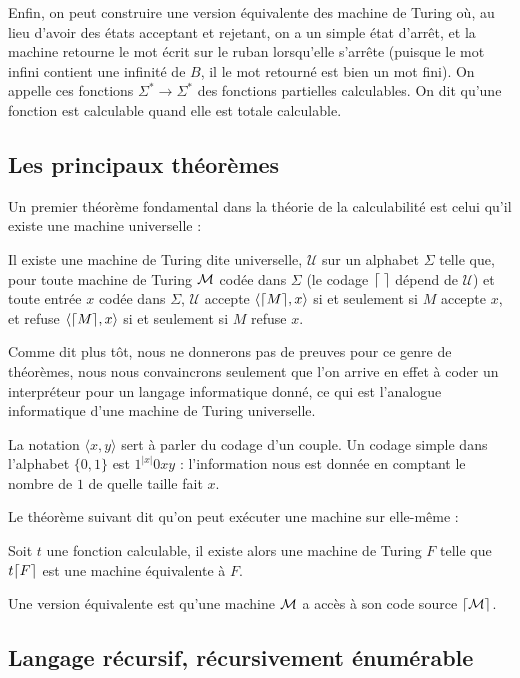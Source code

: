 Enfin, on peut construire une version équivalente des machine de Turing où, au lieu d'avoir des états acceptant et rejetant, on a un simple état d'arrêt, et la machine retourne le mot écrit sur le ruban lorsqu'elle s'arrête (puisque le mot infini contient une infinité de $B$, il le mot retourné est bien un mot fini). On appelle ces fonctions $\Sigma^*\to \Sigma^*$ des fonctions partielles calculables. On dit qu'une fonction est calculable quand elle est totale calculable.

\subsection{Les principaux théorèmes}

Un premier théorème fondamental dans la théorie de la calculabilité est celui qu'il existe une machine universelle :

\begin{them}
    Il existe une machine de Turing dite universelle, $\mathcal U$ sur un alphabet $\Sigma$ telle que, pour toute machine de Turing $\mathcal M$ codée dans $\Sigma$ (le codage $\lceil \; \rceil$ dépend de $\mathcal U$) et toute entrée $x$ codée dans $\Sigma$, $\mathcal U$ accepte $\langle \lceil M \rceil,x\rangle$ si et seulement si $M$ accepte $x$, et refuse $\langle \lceil M \rceil,x\rangle$ si et seulement si $M$ refuse $x$.
\end{them}

Comme dit plus tôt, nous ne donnerons pas de preuves pour ce genre de théorèmes, nous nous convaincrons seulement que l'on arrive en effet à coder un interpréteur pour un langage informatique donné, ce qui est l'analogue informatique d'une machine de Turing universelle.

La notation $\langle x,y\rangle$ sert à parler du codage d'un couple. Un codage simple dans l'alphabet $\{0,1\}$ est $1^{|x|}0 x y$ : l'information nous est donnée en comptant le nombre de $1$ de quelle taille fait $x$.

Le théorème suivant dit qu'on peut exécuter une machine sur elle-même :

\begin{them}
    Soit $t$ une fonction calculable, il existe alors une machine de Turing $F$ telle que $t\lceil F \rceil$ est une machine équivalente à $F$.

    Une version équivalente est qu'une machine $\mathcal M$ a accès à son code source $\lceil \mathcal M \rceil$.
\end{them}

\subsection{Langage récursif, récursivement énumérable}

